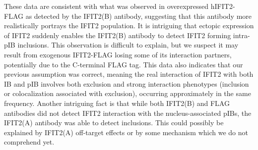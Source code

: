 These data are consistent with what was observed in overexpressed hIFIT2-FLAG as detected by the IFIT2(B) antibody, suggesting that this antibody more realistically portrays the IFIT2 population. It is intriguing that ectopic expression of IFIT2 suddenly enables the IFIT2(B) antibody to detect IFIT2 forming intra-pIB inclusions. This observation is difficult to explain, but we suspect it may result from exogenous IFIT2-FLAG losing some of its interaction partners, potentially due to the C-terminal FLAG tag. This data also indicates that our previous assumption was correct, meaning the real interaction of IFIT2 with both IB and pIB involves both exclusion and strong interaction phenotypes (inclusion or colocalization associated with exclusion), occurring approximately in the same frequency. Another intriguing fact is that while both IFIT2(B) and FLAG antibodies did not detect IFIT2 interaction with the nucleus-associated pIBs, the IFIT2(A) antibody was able to detect inclusions. This could possibly be explained by IFIT2(A) off-target effects or by some mechanism which we do not comprehend yet.

